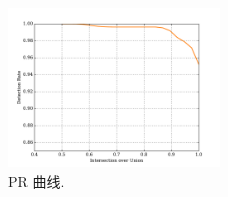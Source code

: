 \renewcommand{\captiontitle}{PR 曲线}
\begin{figure}
\begin{center}
\includegraphics[width=0.5\textwidth]{./data/det_ROC_hgd_3.pdf}
\caption[\captiontitle]{\captiontitle{}.
}
\label{fig:roc}
\end{center}
\end{figure}

